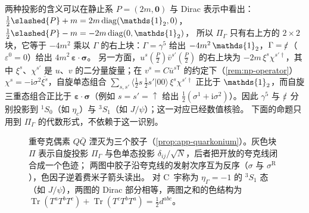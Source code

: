 \documentclass[UTF8,a4paper,11pt,fontset=fandol]{ctexart}
\let\amsmathbb\mathbb
\renewcommand{\mathbb}[1]{\ifx1#1\mathds{1}\else\amsmathbb{#1}\fi}
\theoremstyle{cplain}
\theoremstyle{cdefinition}
\theoremstyle{cremark}
\numberwithin{equation}{section}
\DeclareMathOperator{\Tr}{Tr}
\newcommand{\sla}[1]{\slashed{#1}}                  %
\newcommand{\tp}{\mathsf{T}}                         %
\newcommand{\ii}{\mathrm{i}}                        %
\begin{document}
两种投影的含义可以在静止系 $P=(2m,\boldsymbol 0)$ 与 Dirac 表示中看出：$\frac12\sla P+m=2m\,\mathrm{diag}(\mathbb 1_2,0)$，$\frac12\sla P-m=-2m\,\mathrm{diag}(0,\mathbb 1_2)$，
所以 $\Pi_\Gamma$ 只有右上方的 $2\times2$ 块，它等于 $-4m^2$ 乘以 $\Gamma$ 的右上块：$\Gamma=\gamma^5$ 给出 $-4m^2\,\mathbb 1_2$，$\Gamma=\sla\varepsilon$（$\varepsilon^0=0$）给出 $4m^2\,\boldsymbol\varepsilon\cdot\boldsymbol\sigma$。
另一方面，$u^s(\frac P2)\bar v^{s'}(\frac P2)$ 的右上块为 $-2m\,\xi^s\chi^{s'\dagger}$，其中 $\xi^s$、$\chi^{s'}$ 是 $u$、$v$ 的二分量旋量；在 $v^s=C\bar u^{s\tp}$ 的约定下（\cref{rem:np-operator}）
$\chi^s=-\ii\sigma^2\overline{\xi^s}$，自旋单态组合 $\sum_{s,s'}\langle\tfrac12s\,\tfrac12s'|00\rangle\,\xi^s\chi^{s'\dagger}$ 正比于 $\mathbb 1_2$，而自旋三重态组合正比于 $\boldsymbol\varepsilon\cdot\boldsymbol\sigma$（例如 $s=s'=\uparrow$ 给出 $\frac12(\sigma^1+\ii\sigma^2)$）。因此 $\gamma^5$ 与 $\sla\varepsilon$ 分别投影到 ${}^1S_0$（如 $\eta_c$）与 ${}^3S_1$（如 $J/\psi$）；这一对应已经数值核验。
下面的命题只用到 $\Pi_\Gamma$ 的代数形式，不依赖于这一识别。

\begin{figure}[htbp]
\centering
{}
\caption{重夸克偶素 $Q\bar Q$ 湮灭为三个胶子（\cref{prop:app-quarkonium}）。灰色块 $\Pi$ 表示自旋投影 $\Pi_\Gamma$ 与色单态投影 $\delta_{ij}/\sqrt N$，后者把开放的夸克线闭合成一个色迹；
两图中胶子沿夸克线的发射次序互为反序（$\sigma$ 与 $\sigma^{\mathrm R}$），色因子逆着费米子箭头读出。
对 C~宇称为 $\eta_\Gamma=-1$ 的 ${}^3S_1$ 态（如 $J/\psi$），两图的 Dirac 部分相等，两图之和的色结构为 $\Tr(T^aT^bT^c)+\Tr(T^cT^bT^a)=\tfrac12 d^{abc}$。}
\label{fig:quarkonium}
\end{figure}
\end{document}
